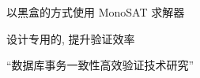 

\begin{frame}{}
	\begin{center}
		\polysi{} 以黑盒的方式使用 MonoSAT 求解器

		\vspace{0.30cm}
		\vspace{0.30cm}

	\end{center}
\end{frame}



\begin{frame}{}
  \begin{center}
		 设计专用的, 提升验证效率

  \end{center}
\end{frame}

\begin{frame}{}
	\begin{center}
		``数据库事务一致性高效验证技术研究''
	\end{center}
\end{frame}

